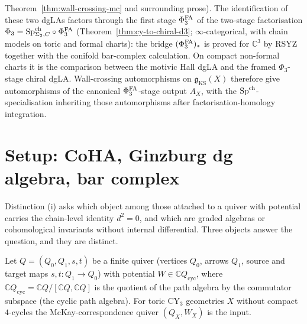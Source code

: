 \begin{enumerate}[label=\textup{(\roman*)}]
 Theorem~\ref{thm:wall-crossing-mc} and surrounding prose). The
 identification of these two dgLAs factors through the first stage
 $\Phi^{\mathrm{FA}}_3$ of the two-stage factorisation
 $\Phi_3 = \mathrm{Sp}^{\mathrm{ch}}_{\Sigma_2,C} \circ \Phi^{\mathrm{FA}}_3$
(Theorem~\ref{thm:cy-to-chiral-d3};
$\infty$-categorical, with chain models on toric and formal charts):
the bridge $(\Phi^{\mathrm{FA}}_3)_*$ is proved for $\mathbb{C}^3$
by RSYZ together with the conifold bar-complex calculation. On compact
non-formal charts it is the comparison between the motivic Hall dgLA
and the framed $\Phi_3$-stage chiral dgLA. Wall-crossing automorphisms on
 $\mathfrak{g}_{\mathrm{KS}}(X)$ therefore give automorphisms of
 the canonical $\Phi^{\mathrm{FA}}_3$-stage output $A_X$, with the
 $\mathrm{Sp}^{\mathrm{ch}}$-specialisation inheriting those automorphisms after
 factorisation-homology integration.
\end{enumerate}

\section{Setup: CoHA, Ginzburg dg algebra, bar complex}
\label{sec:coha-setup-platonic}

Distinction (i) asks which object among those attached to a quiver with
potential carries the chain-level identity $d^2 = 0$, and which are
graded algebras or cohomological invariants without internal differential.
Three objects answer the question, and they are distinct.

Let $Q = (Q_0, Q_1, s, t)$ be a finite quiver (vertices $Q_0$, arrows
$Q_1$, source and target maps $s, t \colon Q_1 \to Q_0$) with potential
$W \in \mathbb{C}Q_{\mathrm{cyc}}$, where $\mathbb{C}Q_{\mathrm{cyc}} =
\mathbb{C}Q / [\mathbb{C}Q, \mathbb{C}Q]$ is the quotient of the path
algebra by the commutator subspace (the cyclic path algebra). For toric
CY$_3$ geometries $X$ without compact $4$-cycles the McKay-correspondence
quiver $(Q_X, W_X)$ is the input.

